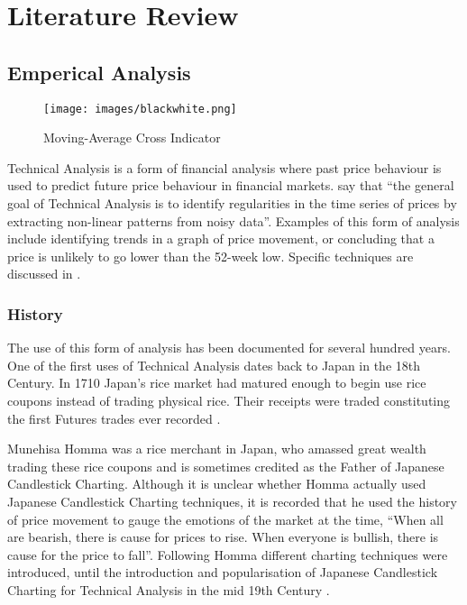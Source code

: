 \documentclass{article}
\theoremstyle{definition}
\begin{document}
\section{Literature Review}

\subsection{Emperical Analysis}

\begin{figure}[H]
    \centering
    \texttt{[image: images/blackwhite.png]}
    \caption{Moving-Average Cross Indicator}
\end{figure}

Technical Analysis is a form of financial analysis where past price behaviour is used to predict future price behaviour in financial markets. \cite{foundations} say that ``the general goal of Technical Analysis is to identify regularities in the time series of prices by extracting non-linear patterns from noisy data''. Examples of this form of analysis include identifying trends in a graph of price movement, or concluding that a price is unlikely to go lower than the 52-week low. Specific techniques are discussed in .

\subsubsection{History}

The use of this form of analysis has been documented for several hundred years. One of the first uses of Technical Analysis dates back to Japan in the 18th Century. In 1710 Japan's rice market had matured enough to begin use rice coupons instead of trading physical rice. Their receipts were traded constituting the first Futures trades ever recorded \citep[p.15]{jcct1991}. 

Munehisa Homma was a rice merchant in Japan, who amassed great wealth trading these rice coupons and is sometimes credited as the Father of Japanese Candlestick Charting. Although it is unclear whether Homma actually used Japanese Candlestick Charting techniques, it is recorded that he used the history of price movement to gauge the emotions of the market at the time, ``When all are bearish, there is cause for prices to rise. When everyone is bullish, there is cause for the price to fall''. Following Homma different charting techniques were introduced, until the introduction and popularisation of Japanese Candlestick Charting for Technical Analysis in the mid 19th Century \citep[p.18]{jcct1994}.
\end{document}
